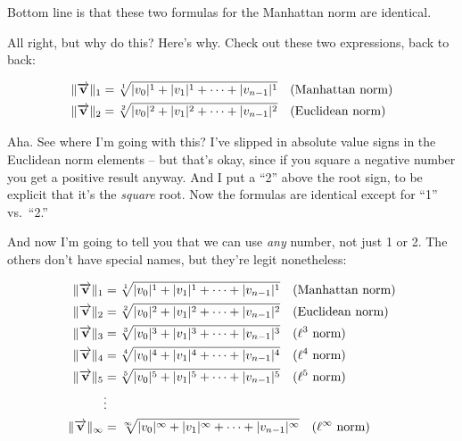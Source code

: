 Bottom line is that these two formulas for the Manhattan norm are identical.

All right, but why do this? Here's why. Check out these two expressions, back
to back:

\vspace{-.15in}
\begin{align*}
\lVert\overrightarrow{\textbf{v}}\rVert_1 &= \sqrt[1]{|v_0|^1 + |v_1|^1 + \cdots +
|v_{n-1}|^1} \quad \textrm{(Manhattan norm)}\\
\lVert\overrightarrow{\textbf{v}}\rVert_2 &= \sqrt[2]{|v_0|^2 + |v_1|^2 + \cdots +
|v_{n-1}|^2} \quad \textrm{(Euclidean norm)}\\
\end{align*}

Aha. See where I'm going with this? I've slipped in absolute value signs in the
Euclidean norm elements -- but that's okay, since if you square a negative
number you get a positive result anyway. And I put a ``2'' above the root sign,
to be explicit that it's the \textit{square} root. Now the formulas are
identical except for ``1'' vs.~``2.''

And now I'm going to tell you that we can use \textit{any} number, not just 1
or 2. The others don't have special names, but they're legit nonetheless:

\vspace{-.15in}
\begin{align*}
\lVert\overrightarrow{\textbf{v}}\rVert_1 &= \sqrt[1]{|v_0|^1 + |v_1|^1 + \cdots +
|v_{n-1}|^1} \quad \textrm{(Manhattan norm)}\\
\lVert\overrightarrow{\textbf{v}}\rVert_2 &= \sqrt[2]{|v_0|^2 + |v_1|^2 + \cdots +
|v_{n-1}|^2} \quad \textrm{(Euclidean norm)}\\
\lVert\overrightarrow{\textbf{v}}\rVert_3 &= \sqrt[3]{|v_0|^3 + |v_1|^3 + \cdots +
|v_{n-1}|^3} \quad \textrm{($\ell^3$ norm)}\\
\lVert\overrightarrow{\textbf{v}}\rVert_4 &= \sqrt[4]{|v_0|^4 + |v_1|^4 + \cdots +
|v_{n-1}|^4} \quad \textrm{($\ell^4$ norm)}\\
\lVert\overrightarrow{\textbf{v}}\rVert_5 &= \sqrt[5]{|v_0|^5 + |v_1|^5 + \cdots +
|v_{n-1}|^5} \quad \textrm{($\ell^5$ norm)}\\
& \vdots \\
\lVert\overrightarrow{\textbf{v}}\rVert_\infty &= \sqrt[\infty]{|v_0|^\infty +
|v_1|^\infty + \cdots + |v_{n-1}|^\infty} \quad \textrm{($\ell^\infty$ norm)}\\
\end{align*}

